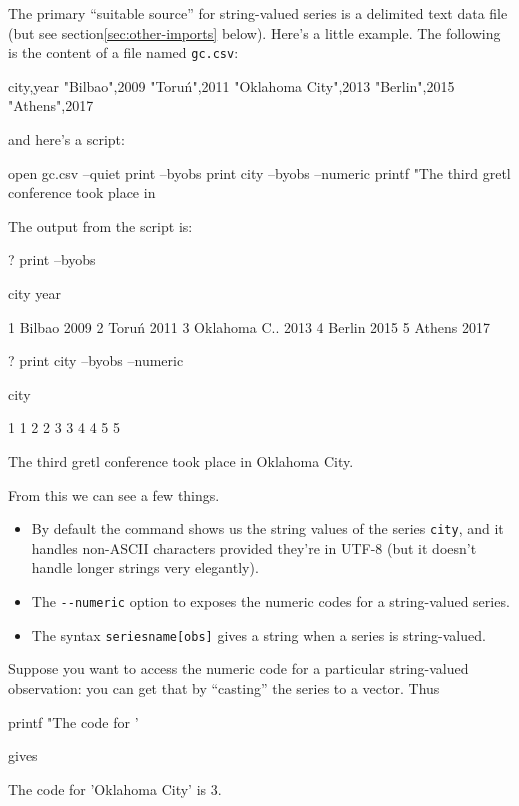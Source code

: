 The primary ``suitable source'' for string-valued series is a
delimited text data file (but see section\ref{sec:other-imports}
below). Here's a little example. The following is the content of a
file named \texttt{gc.csv}:
%
\begin{code}
city,year
"Bilbao",2009
"Toruń",2011
"Oklahoma City",2013
"Berlin",2015
"Athens",2017
\end{code}
%
and here's a script:
%
\begin{code}
open gc.csv --quiet
print --byobs
print city --byobs --numeric
printf "The third gretl conference took place in %
\end{code}

The output from the script is:
%
\begin{code}
? print --byobs

          city         year

1       Bilbao         2009
2        Toruń         2011
3 Oklahoma C..         2013
4       Berlin         2015
5       Athens         2017

? print city --byobs --numeric

          city

1            1
2            2
3            3
4            4
5            5

The third gretl conference took place in Oklahoma City.
\end{code}

From this we can see a few things. 
\begin{itemize}
\item By default the  command shows us the string values
  of the series \texttt{city}, and it handles non-ASCII characters
  provided they're in UTF-8 (but it doesn't handle longer strings
  very elegantly).
\item The \verb|--numeric| option to  exposes the
  numeric codes for a string-valued series.
\item The syntax \texttt{seriesname[obs]} gives a string when a series
  is string-valued.
\end{itemize}

Suppose you want to access the numeric code for a particular
string-valued observation: you can get that by ``casting'' the series
to a vector. Thus
\begin{code}
printf "The code for '%
\end{code}
gives
\begin{code}
The code for 'Oklahoma City' is 3.
\end{code}

